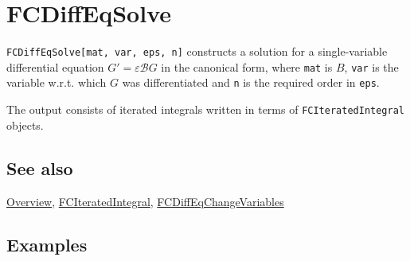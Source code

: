 \documentclass[../FeynCalcManual.tex]{subfiles}
\begin{document}
\begin{Shaded}
\begin{Highlighting}[]
 
\end{Highlighting}
\end{Shaded}

\hypertarget{fcdiffeqsolve}{
\section{FCDiffEqSolve}\label{fcdiffeqsolve}}

\texttt{FCDiffEqSolve[\allowbreak{}mat,\ \allowbreak{}var,\ \allowbreak{}eps,\ \allowbreak{}n]}
constructs a solution for a single-variable differential equation
\(G' = \varepsilon \mathcal{B} G\) in the canonical form, where
\texttt{mat} is \(B\), \texttt{var} is the variable w.r.t. which \(G\)
was differentiated and \texttt{n} is the required order in \texttt{eps}.

The output consists of iterated integrals written in terms of
\texttt{FCIteratedIntegral} objects.

\subsection{See also}

\hyperlink{toc}{Overview},
\hyperlink{fciteratedintegral}{FCIteratedIntegral},
\hyperlink{fcdiffeqchangevariables}{FCDiffEqChangeVariables}

\subsection{Examples}

\begin{Shaded}
\begin{Highlighting}[]
\ExtensionTok{=} \OperatorTok{\{\{}\SpecialCharTok{{-}}\SpecialCharTok{/}\OperatorTok{,} \OperatorTok{,} \OperatorTok{\},} \OperatorTok{\{}\OperatorTok{,} \OperatorTok{,} \OperatorTok{\},} \OperatorTok{\{}\SpecialCharTok{{-}}\SpecialCharTok{\^{}}\NormalTok{(}\SpecialCharTok{{-}}\NormalTok{)}\OperatorTok{,} \SpecialCharTok{/}\OperatorTok{,} \SpecialCharTok{{-}}\SpecialCharTok{/}\OperatorTok{\}\}}
\end{Highlighting}
\end{Shaded}
\end{document}
